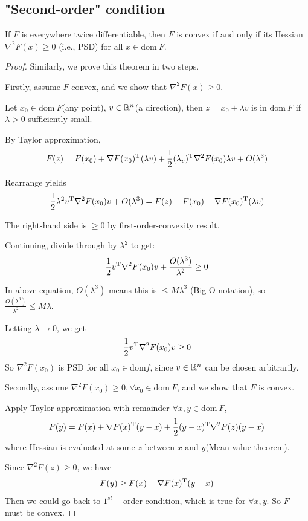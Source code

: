 \subsection{"Second-order" condition}

\begin{theorem}
	If $F$ is everywhere twice differentiable, then $F$ is convex if and only if its Hessian $\nabla^2F(x)\geq 0$ (i.e., PSD) for all $x\in \text{dom}\ F$.
\end{theorem}

\begin{proof}

Similarly, we prove this theorem in two steps.

Firstly, assume $F$ convex, and we show that $\nabla^2F(x)\geq 0$.

Let $x_0 \in \text{dom}\ F$(any point), $v\in \mathbb{R}^n$(a direction), then $z = x_0 + \lambda v$ is in $\text{dom}\ F$ if $\lambda > 0$ sufficiently small. 

By Taylor approximation, 
$$F(z) = F(x_0) + \nabla F(x_0)^{{\rm T}}(\lambda v) + \frac{1}{2}(\lambda_v)^{{\rm T}}\nabla^2F(x_0)\lambda v + O(\lambda^3)$$

Rearrange yields 
$$\frac{1}{2}\lambda^2v^{{\rm T}}\nabla^2F(x_0)v+O(\lambda^3) = F(z) - F(x_0) - \nabla F(x_0)^{{\rm T}}(\lambda v)$$

The right-hand side is $\geq 0$ by first-order-convexity result.

Continuing, divide through by $\lambda^2$ to get:
$$\frac{1}{2}v^{{\rm T}}\nabla^2F(x_0)v + \frac{O(\lambda^3)}{\lambda^2} \geq 0$$

In above equation, $O(\lambda^3)$ means this is $\leq M\lambda^3$ (Big-O notation), so $\frac{O(\lambda^3)}{\lambda^2} \leq M\lambda$.

Letting $\lambda\rightarrow 0$, we get 
$$\frac{1}{2}v^{{\rm T}}\nabla^2F(x_0)v\geq 0$$
So $\nabla^2F(x_0)$ is PSD for all $x_0 \in \text{dom}f$, since $v\in \mathbb{R}^n$ can be chosen arbitrarily.


\vspace{0.3cm}
Secondly, assume $\nabla^2F(x_0)\geq 0, \forall x_0\in \text{dom}\ F$, and we show that $F$ is convex.

Apply Taylor approximation with remainder $\forall x,y\in \text{dom}\ F$, 
$$F(y) =F(x) + \nabla F(x)^{{\rm T}}(y-x) + \frac{1}{2}(y-x)^{{\rm T}}\nabla^2F(z)(y-x)$$
where Hessian is evaluated at some $z$ between $x$ and $y$(Mean value theorem).

Since $\nabla^2F(z)\geq 0$, we have
$$F(y) \geq F(x) + \nabla F(x)^{{\rm T}} (y-x)$$
Then we could go back to $1^{st}-$order-condition, which is true for $\forall x,y$. So $F$ must be convex. 
\end{proof}



